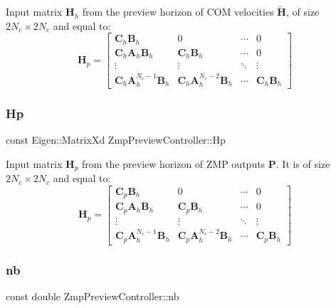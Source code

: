 Input matrix $\mathbf{H}_h$ from the preview horizon of C\+OM velocities $\tilde{\mathbf{H}}$, of size $2N_c \times 2N_c$ and equal to\+: \[ \mathbf{H}_p = \left[\begin{array}{cccc} \mathbf{C}_h\mathbf{B}_h & 0 & \cdots & 0 \\ \mathbf{C}_h\mathbf{A}_h\mathbf{B}_h & \mathbf{C}_h\mathbf{B}_h & \cdots & 0 \\ \vdots & \vdots & \ddots & \vdots \\ \mathbf{C}_h\mathbf{A}^{N_c-1}_h\mathbf{B}_h & \mathbf{C}_h\mathbf{A}^{N_c-2}_h\mathbf{B}_h & \cdots & \mathbf{C}_h\mathbf{B}_h \end{array}\right] \] \hypertarget{classZmpPreviewController_a32ab17a3be30490e4a1e874bf3581843}{}\label{classZmpPreviewController_a32ab17a3be30490e4a1e874bf3581843} 
\subsubsection{\texorpdfstring{Hp}{Hp}}
{\footnotesize\ttfamily const Eigen\+::\+Matrix\+Xd Zmp\+Preview\+Controller\+::\+Hp\hspace{0.3cm}{\ttfamily [private]}}

Input matrix $\mathbf{H}_p$ from the preview horizon of Z\+MP outputs $\mathbf{P}$. It is of size $2N_c \times 2N_c$ and equal to\+: \[ \mathbf{H}_p = \left[\begin{array}{cccc} \mathbf{C}_p\mathbf{B}_h & 0 & \cdots & 0 \\ \mathbf{C}_p\mathbf{A}_h\mathbf{B}_h & \mathbf{C}_p\mathbf{B}_h & \cdots & 0 \\ \vdots & \vdots & \ddots & \vdots \\ \mathbf{C}_p\mathbf{A}^{N_c-1}_h\mathbf{B}_h & \mathbf{C}_p\mathbf{A}^{N_c-2}_h\mathbf{B}_h & \cdots & \mathbf{C}_p\mathbf{B}_h \end{array}\right] \] \hypertarget{classZmpPreviewController_a6716ee4c94e6f91e608ee1e29fbc7051}{}\label{classZmpPreviewController_a6716ee4c94e6f91e608ee1e29fbc7051} 
\subsubsection{\texorpdfstring{nb}{nb}}
{\footnotesize\ttfamily const double Zmp\+Preview\+Controller\+::nb\hspace{0.3cm}{\ttfamily [private]}}


